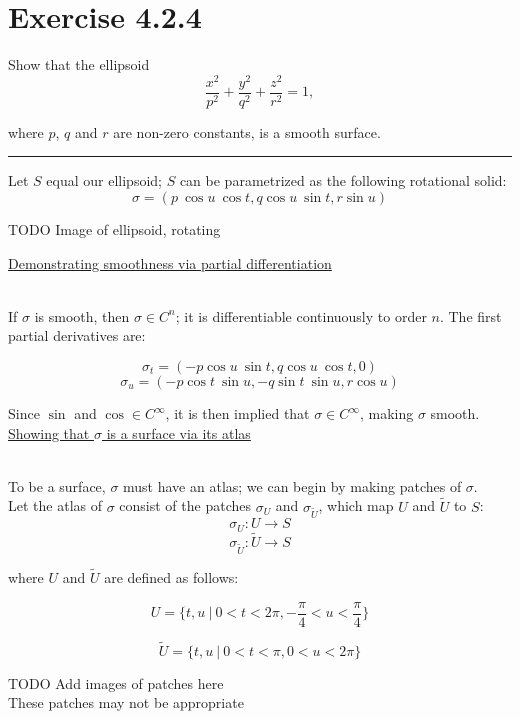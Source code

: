 \documentclass[12pt]{article}
\newcommand{\ulind}[1]
{
\noindent
\underline{#1}\\\\
\indent
}
\begin{document}
\maketitle

\section*{Exercise 4.2.4}
Show that the ellipsoid
$$
\frac{x^2}{p^2} + \frac{y^2}{q^2} + \frac{z^2}{r^2} = 1,
$$

where $p$, $q$ and $r$ are non-zero constants, is a smooth surface.

\vspace{1cm}
\hrule
\vspace{1cm}
\noindent

Let $S$ equal our ellipsoid; $S$ can be parametrized as the following rotational solid:
$$
\sigma = (p \ \cos u \ \cos t, q \cos u \ \sin t, r \sin u)
$$

TODO
Image of ellipsoid, rotating

\ulind{Demonstrating smoothness via partial differentiation}
If $\sigma$ is smooth, then $\sigma \in C^n$; it is differentiable continuously to order $n$. The first partial derivatives are:

$$
\sigma_t = (-p \cos u \ \sin t, q \cos u \ \cos t, 0)
$$
$$
\sigma_u = (-p \cos t \ \sin u, -q \sin t \ \sin u, r \cos u)
$$

Since $\sin $ and $\cos \in C^\infty$, it is then implied that $\sigma \in C^\infty$, making $\sigma$ smooth.\\

\ulind{Showing that $\sigma$ is a surface via its atlas}
To be a surface, $\sigma$ must have an atlas; we can begin by making patches of $\sigma$.\\

\clearpage 
Let the atlas of $\sigma$ consist of the patches $\sigma_U$ and $\sigma_{\widetilde U}$, which map $U$ and $\widetilde U$ to $S$:\\

$$
\sigma_{U} : U \rightarrow S
$$
$$
\sigma_{\widetilde U} : \widetilde U \rightarrow S
$$

where $U$ and $\widetilde U$ are defined as follows:

$$
U = \lbrace t, u \ | \ 0 < t < 2 \pi, -\frac{\pi}{4} < u < \frac{\pi}{4} \rbrace
$$

$$
\widetilde U = \lbrace t, u \ | \ 0 < t < \pi, 0 < u < 2 \pi \rbrace
$$

TODO
Add images of patches here\\
These patches may not be appropriate
\end{document}
